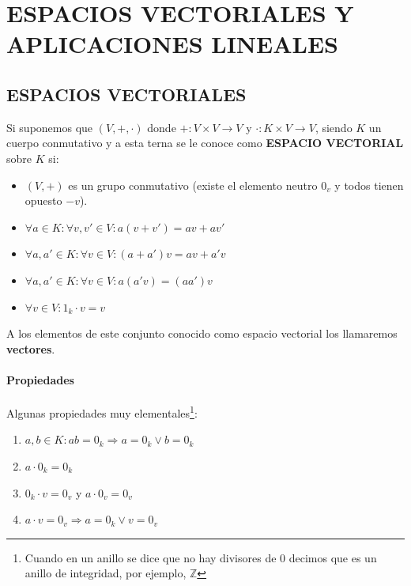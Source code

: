 \documentclass[10pt,a4paper,openright]{book}
\begin{document}
\chapter*{ESPACIOS VECTORIALES Y \\APLICACIONES LINEALES}
\section*{ESPACIOS VECTORIALES}
Si suponemos que $(V,+,\cdot)$ donde $+: V\times V\rightarrow V$ y $\cdot : K\times V\rightarrow V$, siendo $K$ un cuerpo conmutativo y a esta terna se le conoce como \textbf{ESPACIO VECTORIAL} sobre $K$ si:
\begin{itemize}
\item $(V,+)$ es un grupo conmutativo (existe el elemento neutro $0_v$ y todos tienen opuesto $-v$).

\item $\forall a \in K: \forall v,v'\in V: a(v+v')=av+av'$

\item $\forall a,a' \in K: \forall v\in V: (a+a')v=av+a'v$

\item $\forall a,a'\in K: \forall v \in V: a(a'v)=(aa')v$

\item $\forall v\in V: 1_k\cdot v=v$
\end{itemize}
A los elementos de este conjunto conocido como espacio vectorial los llamaremos \textbf{vectores}.

\subsubsection*{Propiedades}
Algunas propiedades muy elementales\footnote{Cuando en un anillo se dice que no hay divisores de 0 decimos que es un anillo de integridad, por ejemplo, $\mathbb Z$}:
\begin{enumerate}
\item $a,b\in K: ab=0_k\Rightarrow a=0_k \vee b=0_k$

\item $a\cdot 0_k=0_k$

\item $0_k\cdot v=0_v$ y $a\cdot 0_v=0_v$

\item $a\cdot v=0_v\Rightarrow a=0_k \vee v=0_v$
\end{enumerate}
\end{document}
